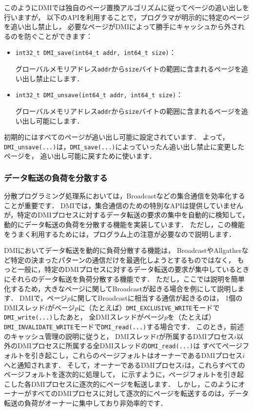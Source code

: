 \documentclass[report,12pt]{jsbook}
\begin{document}
このようにDMIでは独自のページ置換アルゴリズムに従ってページの追い出しを行いますが，
以下のAPIを利用することで，プログラマが明示的に特定のページを追い出し禁止し，
必要なページがDMIによって勝手にキャッシュから外されるのを防ぐことができます：
\begin{itemize}
\item \texttt{int32\_t DMI\_save(int64\_t addr, int64\_t size)}：
  
  グローバルメモリアドレス\texttt{addr}から\texttt{size}バイトの範囲に含まれるページを追い出し禁止にします．
\item \texttt{int32\_t DMI\_unsave(int64\_t addr, int64\_t size)}：
  
  グローバルメモリアドレス\texttt{addr}から\texttt{size}バイトの範囲に含まれるページを追い出し可能にします．
\end{itemize}

初期的にはすべてのページが追い出し可能に設定されています．
よって，\texttt{DMI\_unsave(...)}は，\texttt{DMI\_save(...)}によっていったん追い出し禁止に変更したページを，
追い出し可能に戻すために使います．

\subsubsection{データ転送の負荷を分散する}

分散プログラミング処理系においては，Broadcastなどの集合通信を効率化することが重要です．
DMIでは，集合通信のための特別なAPIは提供していませんが，特定のDMIプロセスに対するデータ転送の要求の集中を自動的に検知して，
動的にデータ転送の負荷を分散する機能を実装しています．
ただし，この機能をうまく利用するためには，プログラム上の注意が必要なので説明します．

DMIにおいてデータ転送を動的に負荷分散する機能は，
BroadcastやAllgatherなど特定の決まったパターンの通信だけを最適化しようとするものではなく，
もっと一般に，特定のDMIプロセスに対するデータ転送の要求が集中しているときにそれらのデータ転送を負荷分散する機能です．
ただし，ここでは説明を簡単化するため，大きなページに関してBroadcastが起きる場合を例にして説明します．
DMIで，ページ$p$に関してBroadcastに相当する通信が起きるのは，
1個のDMIスレッド$t$がページ$p$に（たとえば）\texttt{DMI\_EXCLUSIVE\_WRITE}モードで\texttt{DMI\_write(...)}したあと，
全DMIスレッドがページ$p$を（たとえば）\texttt{DMI\_INVALIDATE\_WRITE}モードで\texttt{DMI\_read(...)}する場合です．
このとき，前述のキャッシュ管理の説明に従うと，
DMIスレッド$t$が所属するDMIプロセス$i$以外のDMIプロセスに所属する全DMIスレッドの\texttt{DMI\_read(...)}は
すべてページフォルトを引き起こし，これらのページフォルトはオーナーであるDMIプロセス$i$へと通知されます．
そして，オーナーであるDMIプロセス$i$は，これらすべてのページフォルトを逐次的に処理して，
に示すように，ページフォルトを引き起こした各DMIプロセスに逐次的にページを転送します．
しかし，このようにオーナーがすべてのDMIプロセスに対して逐次的にページを転送するのは，データ転送の負荷がオーナーに集中しており非効率的です．
\end{document}
